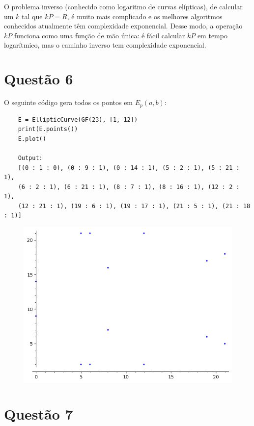 \documentclass{article}
\begin{document}
O problema inverso (conhecido como logaritmo de curvas elípticas), de calcular um $k$ tal que $kP = R$, é muito mais complicado e os melhores algoritmos conhecidos atualmente têm complexidade exponencial. Desse modo, a operação $kP$ funciona como uma função de mão única: é fácil calcular $kP$ em tempo logarítmico, mas o caminho inverso tem complexidade exponencial.

\section*{Questão 6}

O seguinte código gera todos os pontos em $E_p(a, b)$:

\begin{verbatim}
    E = EllipticCurve(GF(23), [1, 12])
    print(E.points())
    E.plot()

    Output:
    [(0 : 1 : 0), (0 : 9 : 1), (0 : 14 : 1), (5 : 2 : 1), (5 : 21 : 1),
    (6 : 2 : 1), (6 : 21 : 1), (8 : 7 : 1), (8 : 16 : 1), (12 : 2 : 1),
    (12 : 21 : 1), (19 : 6 : 1), (19 : 17 : 1), (21 : 5 : 1), (21 : 18 : 1)]
\end{verbatim}


\begin{figure}[!ht]
    \begin{center}
        \includegraphics[width=\textwidth]{images/q6.png}
    \end{center}
\end{figure} 
\FloatBarrier

\section*{Questão 7}
\end{document}
